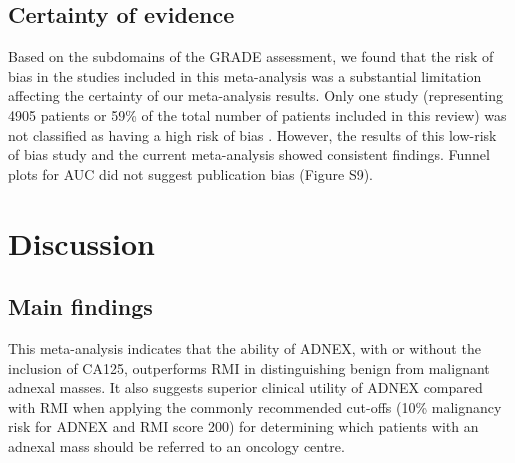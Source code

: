 \subsection{Certainty of evidence}
Based on the subdomains of the \gls{GRADE} assessment, we found that the risk of bias in
the studies included in this meta-analysis was a substantial limitation affecting the
certainty of our meta-analysis results. Only one study (representing 4905 patients or
59\% of the total number of patients included in this review) was not classified as
having a high risk of bias \cite{vancalsterValidationModelsDiagnose2020}. However,
the results of this low-risk of bias study and the current meta-analysis showed
consistent findings. Funnel plots for \gls{AUC} did not suggest publication bias (Figure S9).

\section{Discussion}

\subsection{Main findings}
This meta-analysis indicates that the ability of \gls{ADNEX}, with or without the
inclusion of CA125, outperforms \gls{RMI} in distinguishing benign from malignant adnexal
masses. It also suggests superior clinical utility of \gls{ADNEX} compared with \gls{RMI} when
applying the commonly recommended cut-offs (10\% malignancy risk for \gls{ADNEX} and \gls{RMI}
score 200) for determining which patients with an adnexal mass should be referred to
an oncology centre.

